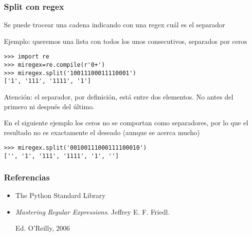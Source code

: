 \documentclass[ucs]{beamer}
\begin{document}
\begin{frame}[fragile]
\frametitle{Split con regex}
Se puede trocear una cadena indicando con una regex cuál es 
el separador

Ejemplo: queremos una lista con todos los unos consecutivos,
separados por ceros
  \begin{footnotesize}
  \begin{verbatim}
>>> import re
>>> miregex=re.compile(r'0+')
>>> miregex.split('10011100011110001')
['1', '111', '1111', '1']
  \end{verbatim}
  \end{footnotesize}
Atención: el separador, por definición, está entre dos 
elementos. No antes del primero ni después del último.

En el siguiente ejemplo los ceros no se comportan como
separadores, por lo que el resultado no es exactamente
el deseado (aunque se acerca mucho)

  \begin{footnotesize}
  \begin{verbatim}
>>> miregex.split('00100111000111100010')
['', '1', '111', '1111', '1', '']
  \end{verbatim}
  \end{footnotesize}



\end{frame}


\begin{frame}[fragile]
\frametitle{Referencias}
\begin{itemize}
\item
The Python Standard Library 
\item
\emph{Mastering Regular Expressions}. Jeffrey E. F. Friedl. 

Ed. O'Reilly, 2006


\end{itemize}

\end{frame}
\end{document}
